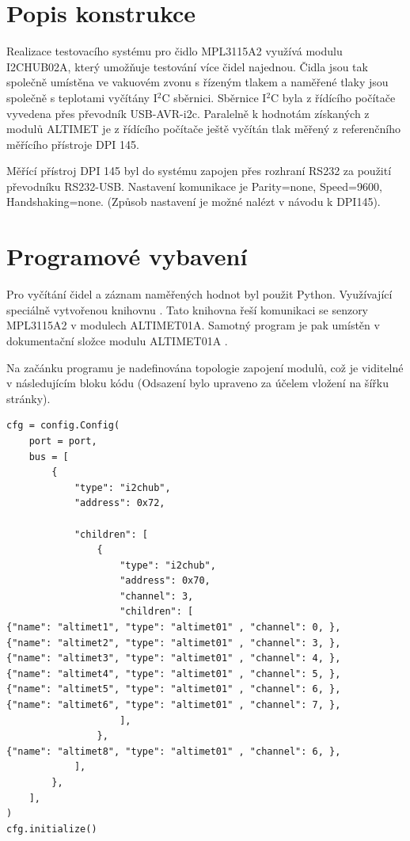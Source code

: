 \documentclass[12pt,a4paper,oneside]{article}
\begin{document}
\newpage
\tableofcontents
\newpage

\section{Popis konstrukce}

Realizace testovacího systému pro čidlo MPL3115A2 využívá modulu I2CHUB02A, který umožňuje testování více čidel najednou. Čidla jsou tak společně umístěna ve vakuovém zvonu s řízeným tlakem a naměřené tlaky jsou společně s teplotami vyčítány I$^2$C sběrnici. Sběrnice I$^2$C byla z řídícího počítače vyvedena přes převodník USB-AVR-i2c. 
Paralelně k hodnotám získaných z modulů ALTIMET je z řídícího počítače ještě vyčítán tlak měřený z referenčního měřícího přístroje DPI 145. 

Měřící přístroj DPI 145 byl do systému zapojen přes rozhraní RS232 za použití převodníku  RS232-USB. Nastavení komunikace je Parity=none, Speed=9600, Handshaking=none. (Způsob nastavení je možné nalézt v návodu k DPI145). 

\section{Programové vybavení}

Pro vyčítání čidel a záznam naměřených hodnot byl použit Python. Využívající speciálně vytvořenou knihovnu  \cite{MLAB-I2c-modules}. Tato knihovna řeší komunikaci se senzory MPL3115A2 v modulech ALTIMET01A. Samotný program je pak umístěn v dokumentační složce modulu ALTIMET01A \cite{data_logger}.

Na začánku programu je nadefinována topologie zapojení modulů, což je viditelné v následujícím bloku kódu (Odsazení bylo upraveno za účelem vložení na šířku stránky).

\lstset{language=Python}
\begin{lstlisting}[frame=single]
cfg = config.Config(
    port = port,
    bus = [
        {
            "type": "i2chub",
            "address": 0x72,
            
            "children": [
                {
                    "type": "i2chub",
                    "address": 0x70,
                    "channel": 3,
                    "children": [
{"name": "altimet1", "type": "altimet01" , "channel": 0, },   
{"name": "altimet2", "type": "altimet01" , "channel": 3, },   
{"name": "altimet3", "type": "altimet01" , "channel": 4, },   
{"name": "altimet4", "type": "altimet01" , "channel": 5, },   
{"name": "altimet5", "type": "altimet01" , "channel": 6, },   
{"name": "altimet6", "type": "altimet01" , "channel": 7, },   
                    ], 
                },
{"name": "altimet8", "type": "altimet01" , "channel": 6, },
            ],
        },
    ],
)
cfg.initialize()
\end{lstlisting}
\end{document}
